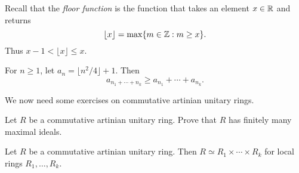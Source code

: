 Recall that the \emph{floor function} is the function that takes an element $x\in\mathbb{R}$ 
and returns 
\[
    \lfloor x\rfloor = \max\{m\in\mathbb{Z}:m\geq x\}.
\]
Thus $x-1<\lfloor x\rfloor\leq x$. 

\begin{exercise}
    \label{xca:floor}
    For $n\geq1$, let $a_n=\lfloor n^2/4\rfloor+1$. Then 
    \[
    a_{n_1+\cdots+n_k}\geq a_{n_1}+\cdots+a_{n_k}.
    \]
\end{exercise}


We now need some exercises on commutative artinian 
unitary rings.

\begin{exercise}
    Let $R$ be a commutative artinian unitary ring. 
    Prove that $R$ has finitely many maximal ideals. 
\end{exercise}


\begin{lemma}
\label{lem:artinian_local}
    Let $R$ be a commutative artinian unitary ring. Then 
    $R\simeq R_1\times\cdots\times R_k$ for local rings $R_1,\dots,R_k$. 
\end{lemma}


